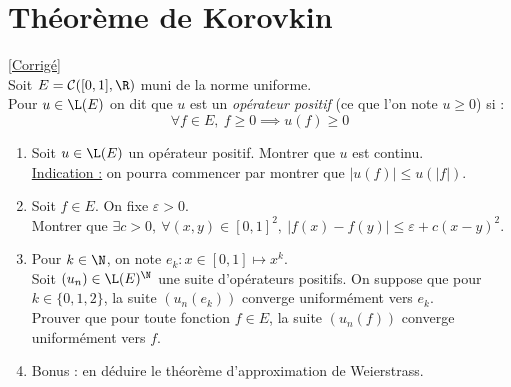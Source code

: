 \documentclass{book}
\begin{document}
	\section{Théorème de Korovkin }
	\textcolor{blue}{\hyperref[Théorème de Korovkin corrigé]{[Corrigé]}}\\
	\label{Théorème de Korovkin}
	Soit $E=\mathcal C([0,1],\R)$ muni de la norme uniforme.\\
	Pour $u\in \L(E)$ on dit que $u$ est un \textit{opérateur positif} (ce que l'on note $u\geq 0$) si :
	$$\forall f\in E,\ f\geq 0\implies u(f)\geq 0$$
	\begin{enumerate}
		\item Soit $u\in \L(E)$ un opérateur positif. Montrer que $u$ est continu.\\
		\underline{Indication :} on pourra commencer par montrer que $|u(f)|\leq u(|f|)$.
		\item Soit $f\in E$. On fixe $\varepsilon>0$.\\
		Montrer que $\exists c>0,\ \forall (x,y)\in [0,1]^2,\ |f(x)-f(y)|\leq \varepsilon+c(x-y)^2$.
		\item Pour $k\in \N$, on note $e_k:x\in [0,1]\mapsto x^k$.\\
		Soit $(u_n)\in \L(E)^\N$ une suite d'opérateurs positifs. On suppose que pour $k\in \{0,1,2\}$, la suite $(u_n(e_k))$ converge uniformément vers $e_k$.\\
		Prouver que pour toute fonction $f\in E$, la suite $(u_n(f))$ converge uniformément vers $f$.
		\item Bonus : en déduire le théorème d'approximation de Weierstrass.
	\end{enumerate}
	
\end{document}
